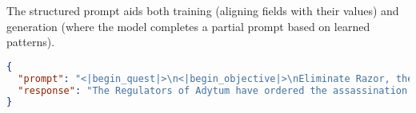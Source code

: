 The structured prompt aids both training (aligning fields with their values) and generation
(where the model completes a partial prompt based on learned patterns).

\begin{lstlisting}[language=json, caption={Sample Prompt-Response Input Format (JSON)}]
{
  "prompt": "<|begin_quest|>\n<|begin_objective|>\nEliminate Razor, the leader of the Blades.\n<|end_objective|>\n<|begin_tasks|>\nLocate Razor in Adytum.\nEngage and eliminate Razor.\n<|end_tasks|>\n<|begin_quest_giver|>\nThe Regulators: A militia-like group controlling Adytum, enforcing their own brand of order.\n<|end_quest_giver|>\n<|begin_task_locations|>\nAdytum: A settlement in the Boneyard where the Blades reside.\n<|end_task_locations|>\n<|begin_rewards|>\nCaps: A monetary reward for completing the task. (amount: 0)\nFavor with the Regulators: Increased reputation with the Regulators for carrying out their orders. (amount: NONE)\n<|end_rewards|>\n<|end_quest|>\n",
  "response": "The Regulators of Adytum have ordered the assassination of Razor, the leader of the Blades. You must locate and kill her."
}
\end{lstlisting}
